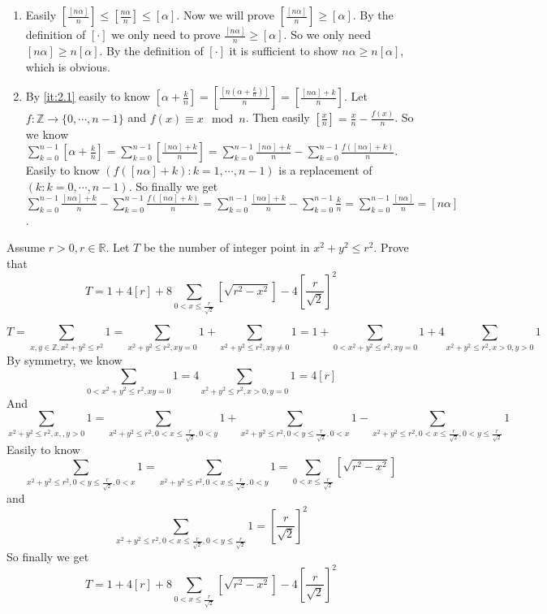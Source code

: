 \documentclass{ctexart}
\begin{document}
\begin{solution}
  \begin{enumerate}
    \item \label{it:2.1} Easily \(\left[\frac{[n \alpha]}{n}\right]\leq\left[\frac{n \alpha}{n}\right] \leq[\alpha]\).
      Now we will prove \(\left[\frac{[n \alpha]}{n}\right]\geq [\alpha]\).
      By the definition of \([\cdot]\) we only need to prove \(\frac{[n \alpha]}{n}\geq [\alpha]\).
      So we only need \([n \alpha]\geq n [\alpha]\).
      By the definition of \([\cdot]\) it is sufficient to show \(n \alpha \geq n[\alpha]\), which is obvious.
    \item By \ref{it:2.1} easily to know \([\alpha+\frac{k}{n}]=\left[\frac{[n(\alpha+\frac{k}{n})]}{n}\right]=
      \left[\frac{[n \alpha]+k}{n}\right]\).
      Let \(f:\mathbb{Z} \to \{0,\cdots,n-1\}\) and \(f(x)\equiv x \mod n\).
      Then easily \([\frac{x}{n}]=\frac{x}{n}-\frac{f(x)}{n}\).
      So we know \(\sum_{k=0}^{n-1}[\alpha+\frac{k}{n}]=\sum_{k=0}^{n-1}[\frac{[n \alpha]+k}{n}]=
      \sum_{k=0}^{n-1}\frac{[n \alpha]+k}{n}-\sum_{k=0}^{n-1}\frac{f([n \alpha]+k)}{n}\).
      Easily to know \((f([n \alpha]+k):k=1,\cdots,n-1)\) is a replacement of \((k:k=0,\cdots,n-1)\).
      So finally we get \(\sum_{k=0}^{n-1}\frac{[n \alpha]+k}{n}-\sum_{k=0}^{n-1}\frac{f([n \alpha]+k)}{n}=\sum_{k=0}^{n-1}\frac{[n \alpha]+k}{n}-\sum_{k=0}^{n-1}\frac{k}{n}=\sum_{k=0}^{n-1}\frac{[n \alpha]}{n}=[n \alpha]\).
  \end{enumerate}
\end{solution}
\begin{problem}\label{pro:p16.4.3}
  Assume \(r>0,r \in \mathbb{R}\). Let \(T\) be the number of integer point in  \(x^2 + y^2 \leq r^2\).
  Prove that
  \[
    T = 1 + 4[r] + 8 \sum_{0<x \leq \frac{r}{\sqrt{2}}}[\sqrt{r^2-x^2}] -4\left[\frac{r}{\sqrt{2}}\right]^2
  \]
\end{problem}
\begin{solution}
  \[
    T=\sum_{x,y \in \mathbb{Z},x^2 + y^2 \leq r^2}1=\sum_{x^2 + y^2 \leq r^2,xy=0} 1 +\sum_{x^2+y^2 \leq r^2,xy \neq 0} 1=
    1+\sum_{0<x^2 + y^2 \leq r^2,xy=0} 1 +4 \sum_{x^2 + y^2 \leq r^2,x>0,y>0} 1
  \]
  By symmetry, we know
  \[
    \sum_{0<x^2 + y^2 \leq r^2,xy=0} 1 =4\sum_{x^2 + y^2 \leq r^2,x >0,y=0} 1=4[r]
  \]
  And
  \[
    \sum_{x^2 + y^2 \leq r^2,x,,y>0} 1 =\sum_{x^2+y^2 \leq r^2,0<x \leq \frac{r}{\sqrt{2}},0<y} 1 + \sum_{x^2+y^2 \leq r^2,0<y \leq \frac{r}{\sqrt{2}},0<x} 1 -\sum_{x^2+y^2 \leq r^2,0<x \leq \frac{r}{\sqrt{2}},0<y \leq \frac{r}{\sqrt{2}}} 1
  \]
  Easily to know
  \[
    \sum_{x^2+y^2 \leq r^2,0<y \leq \frac{r}{\sqrt{2}},0<x} 1 =\sum_{x^2+y^2 \leq r^2,0<x \leq \frac{r}{\sqrt{2}},0<y} 1 =\sum_{0<x \leq \frac{r}{\sqrt{2}}}[\sqrt{r^2-x^2}]
  \]
  and
  \[
    \sum_{x^2+y^2 \leq r^2,0<x \leq \frac{r}{\sqrt{2}},0<y \leq \frac{r}{\sqrt{2}}} 1=\left[\frac{r}{\sqrt{2}}\right]^2
  \]
  So finally we get
  \[
    T = 1 + 4[r] + 8 \sum_{0<x \leq \frac{r}{\sqrt{2}}}[\sqrt{r^2-x^2}] -4\left[\frac{r}{\sqrt{2}}\right]^2
  \]
\end{solution}
\end{document}
